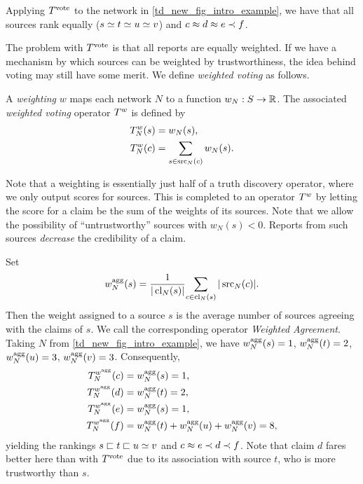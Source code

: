 Applying $T^{\operatorname{vote}}{}$ to the network in \cref{td_new_fig_intro_example}, we have
that all sources rank equally ($s \simeq t \simeq u \simeq v$) and $c \approx d \approx e
\prec f$.

The problem with $T^{\operatorname{vote}}{}$ is that all reports are equally weighted. If we
have a mechanism by which sources can be weighted by trustworthiness, the idea
behind voting may still have some merit. We define \emph{weighted voting} as
follows.

\begin{definition}
    A \emph{weighting} $w$ maps each network $N$ to a function $w_N: S \to \mathbb{R}$.
    The associated \emph{weighted voting} operator $T^{w}$ is defined by
    \begin{align*}
        T^{w}_N(s) &= w_N(s), \\
        T^{w}_N(c) &= \sum_{s \in \operatorname{src}_N(c)}{w_N(s)}.
    \end{align*}
\end{definition}

Note that a weighting is essentially just half of a truth discovery operator,
where we only output scores for sources. This is completed to an operator
$T^{w}$ by letting the score for a claim be the sum of the weights of its
sources. Note that we allow the possibility of ``untrustworthy'' sources with
$w_N(s) < 0$. Reports from such sources \emph{decrease} the credibility of a
claim.

\begin{example}
    \label{td_new_ex_weighted_voting}
    Set
    \[
        w^{\operatorname{agg}}_N(s) = \frac{1}{|\operatorname{cl}_N(s)|}{
            \sum_{c \in \operatorname{cl}_N(s)}{
                |\operatorname{src}_N(c)|
            }
        }.
    \]
    Then the weight assigned to a source $s$ is the average number of sources
    agreeing with the claims of $s$. We call the corresponding operator
    \emph{Weighted Agreement}. Taking $N$ from
    \cref{td_new_fig_intro_example}, we have $w^{\operatorname{agg}}_N(s) = 1$, $w^{\operatorname{agg}}_N(t) = 2$,
    $w^{\operatorname{agg}}_N(u) = 3$, $w^{\operatorname{agg}}_N(v) = 3$. Consequently,
    \begin{align*}
        T^{w^{\operatorname{agg}}}_N(c) &= w^{\operatorname{agg}}_N(s) = 1,\\
        T^{w^{\operatorname{agg}}}_N(d) &= w^{\operatorname{agg}}_N(t) = 2,\\
        T^{w^{\operatorname{agg}}}_N(e) &= w^{\operatorname{agg}}_N(s) = 1,\\
        T^{w^{\operatorname{agg}}}_N(f) &= w^{\operatorname{agg}}_N(t) + w^{\operatorname{agg}}_N(u) + w^{\operatorname{agg}}_N(v) = 8,
    \end{align*}
    yielding the rankings $s \sqsubset t \sqsubset u \simeq v$ and $c \approx e \prec d \prec
    f$. Note that claim $d$ fares better here than with $T^{\operatorname{vote}}$ due to its
    association with source $t$, who is more trustworthy than $s$.
\end{example}

